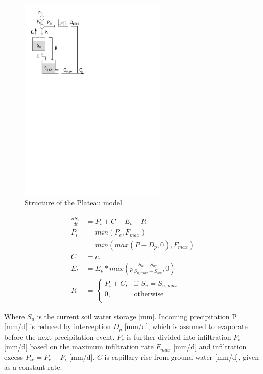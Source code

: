 { 																	%
\begin{figure}
\includegraphics[trim=1cm 19cm 9cm 1cm,width=7cm,keepaspectratio]{./files/15_schematic.pdf}
\caption{Structure of the Plateau model} \label{fig:15_schematic}
\end{figure}

\begin{align}
	\frac{dS_u}{dt} &= P_i+C-E_t-R \\
	P_i &= min(P_e,F_{max})\\
		& = min\left(max(P-D_p,0),F_{max}\right)\\
	C &= c.\\
	E_t &= E_p*max\left(p\frac{S_u-S_{wp}}{S_{u,max}-S_{wp}},0\right)\\
	R &=	\begin{cases}
		P_i+C, & \text{if } S_u = S_{u,max} \\
		0, & \text{otherwise}\\
	\end{cases}
\end{align}

Where $S_u$ is the current soil water storage [mm]. Incoming precipitation P [mm/d] is reduced by interception $D_p$ [mm/d], which is assumed to evaporate before the next precipitation event. $P_e$ is further divided into infiltration $P_i$ [mm/d] based on the maximum infiltration rate $F_{max}$ [mm/d] and infiltration excess $P_{ie} = P_e-P_i$ [mm/d]. $C$ is capillary rise from ground water [mm/d], given as a constant rate.

 } %

